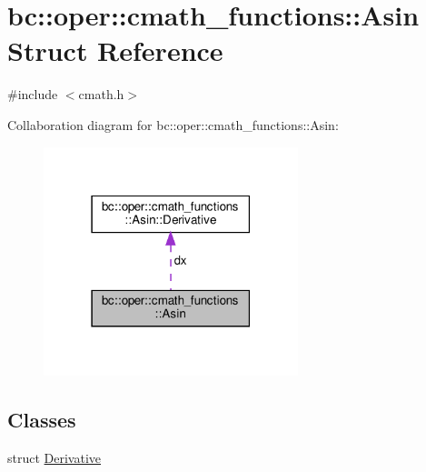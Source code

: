 \hypertarget{structbc_1_1oper_1_1cmath__functions_1_1Asin}{}\section{bc\+:\+:oper\+:\+:cmath\+\_\+functions\+:\+:Asin Struct Reference}
\label{structbc_1_1oper_1_1cmath__functions_1_1Asin}


{\ttfamily \#include $<$cmath.\+h$>$}



Collaboration diagram for bc\+:\+:oper\+:\+:cmath\+\_\+functions\+:\+:Asin\+:\nopagebreak
\begin{figure}[H]
\begin{center}
\leavevmode
\includegraphics[width=210pt]{structbc_1_1oper_1_1cmath__functions_1_1Asin__coll__graph}
\end{center}
\end{figure}
\subsection*{Classes}
\begin{DoxyCompactItemize}
\item 
struct \hyperlink{structbc_1_1oper_1_1cmath__functions_1_1Asin_1_1Derivative}{Derivative}
\end{DoxyCompactItemize}
